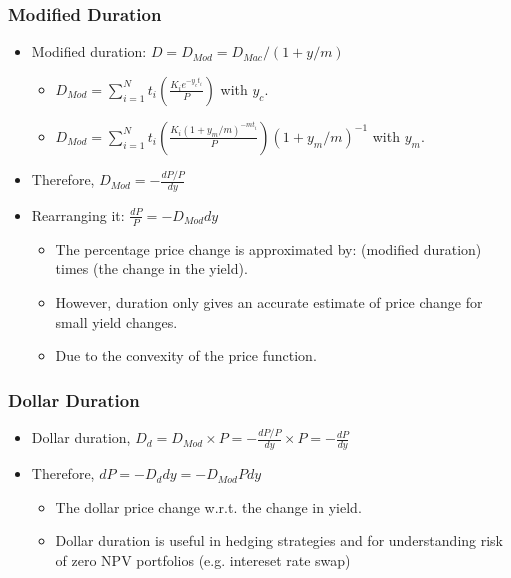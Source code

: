 \documentclass[10pt]{beamer}
\begin{document}
\begin{frame}
	\frametitle{Modified Duration}
	
	\begin{itemize} \itemsep15pt
		\item Modified duration: $D = D_{Mod} = D_{Mac}/(1+y/m)$
		
		\begin{itemize}
			\item $D_{Mod} =\sum_{i=1}^{N} t_i \left( \frac{ K_i e^{-y_c t_i}}{P}  \right)$ with $y_c$.
			
			\item $D_{Mod}= \sum_{i=1}^{N} t_i \left( \frac{ K_i \left( 1+y_m/m \right)^{-mt_i}  }{P} \right) \left( 1+ y_m/m \right)^{-1} $ with $y_m$.
		\end{itemize}
		
		
		
		
		\item Therefore, $D_{Mod} = - \frac{dP/P}{dy}$ 
				
		\item Rearranging it:  $\frac{dP}{P}  = -D_{Mod}dy$
		
		\begin{itemize} \itemsep10pt \vspace{10pt}
			\item The percentage price change is approximated by:
			(modified duration) times (the change in the yield).
			\item However, duration only gives an accurate
			estimate of price change for small yield changes.
			\item Due to the convexity of the price function.
		\end{itemize}
	\end{itemize}
	
\end{frame}



\begin{frame}
	\frametitle{Dollar Duration}
	
	\begin{itemize} \itemsep15pt
		\item Dollar duration, $D_d = D_{Mod} \times P = -\frac{dP/P}{dy} \times P = -\frac{dP}{dy}$
		
		\item Therefore, $dP = -D_d dy = -D_{Mod} P dy$
		
		\begin{itemize} \itemsep10pt \vspace{10pt}
			\item The dollar price change w.r.t. the change in yield.
			\item Dollar duration is useful in hedging strategies and for understanding risk of zero NPV portfolios (e.g. intereset rate swap)
		\end{itemize}
	\end{itemize}
	
\end{frame}
\end{document}
